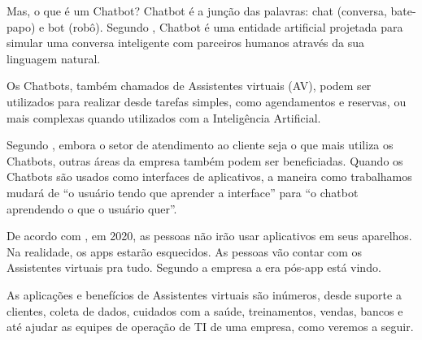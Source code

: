 \documentclass[quali]{mpit}
\begin{document}
Mas, o que é um Chatbot? Chatbot é a junção das palavras: chat (conversa, bate-papo) e bot (robô). Segundo \cite{Reshmi2016ImplementationBases}, Chatbot é uma entidade artificial projetada para simular uma conversa inteligente com parceiros humanos através da sua
linguagem natural.

Os Chatbots, também chamados de Assistentes virtuais (AV), podem ser utilizados para realizar desde tarefas simples, como agendamentos e reservas, ou mais complexas quando utilizados com a Inteligência Artificial.

Segundo \cite{Gartner2018GartnerYears}, embora o setor de atendimento ao cliente seja o que mais utiliza os Chatbots, outras áreas da empresa também podem ser beneficiadas. Quando os Chatbots são usados como interfaces de aplicativos, a maneira como trabalhamos mudará de ``o usuário tendo que aprender a interface'' para  ``o chatbot aprendendo o que o usuário quer''. 

De acordo com \cite{GatewaySun2016Gartner:Robots},  em 2020, as pessoas não irão usar aplicativos em seus aparelhos. Na realidade, os apps estarão esquecidos. As pessoas vão contar com os Assistentes virtuais pra tudo. Segundo a empresa a era pós-app está vindo.

As aplicações e benefícios de Assistentes virtuais são inúmeros, desde suporte a clientes, coleta de dados, cuidados com a saúde, treinamentos, vendas, bancos e até ajudar as equipes de operação de TI de uma empresa, como veremos a seguir. 
\end{document}
